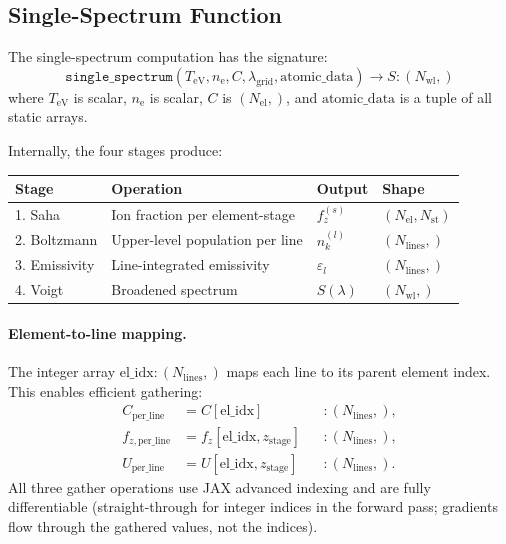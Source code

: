 \documentclass[11pt]{article}
\newcommand{\TeV}{T_\mathrm{eV}}
\newcommand{\ne}{n_\mathrm{e}}
\begin{document}
\subsection{Single-Spectrum Function}
\label{sec:single-spectrum}

The single-spectrum computation has the signature:
\begin{equation}
  \label{eq:single-sig}
  \texttt{single\_spectrum}(\TeV, \ne, C, \lambda_\mathrm{grid},
  \mathrm{atomic\_data}) \to S \colon (N_\mathrm{wl},)
\end{equation}
where $\TeV$ is scalar, $\ne$ is scalar, $C$ is $(N_\mathrm{el},)$,
and $\mathrm{atomic\_data}$ is a tuple of all static arrays.

Internally, the four stages produce:
\begin{center}
\begin{tabular}{llll}
\toprule
\textbf{Stage} & \textbf{Operation} & \textbf{Output} & \textbf{Shape} \\
\midrule
1. Saha    & Ion fraction per element-stage & $f_z^{(s)}$  & $(N_\mathrm{el}, N_\mathrm{st})$ \\
2. Boltzmann & Upper-level population per line & $n_k^{(l)}$ & $(N_\mathrm{lines},)$ \\
3. Emissivity & Line-integrated emissivity      & $\varepsilon_l$ & $(N_\mathrm{lines},)$ \\
4. Voigt   & Broadened spectrum               & $S(\lambda)$ & $(N_\mathrm{wl},)$ \\
\bottomrule
\end{tabular}
\end{center}

\paragraph{Element-to-line mapping.}
The integer array $\mathrm{el\_idx}\colon (N_\mathrm{lines},)$ maps each line
to its parent element index. This enables efficient gathering:
\begin{align}
  C_\mathrm{per\_line} &= C[\mathrm{el\_idx}] &&\colon (N_\mathrm{lines},), \label{eq:gather-C}\\
  f_{z,\mathrm{per\_line}} &= f_z[\mathrm{el\_idx}, z_\mathrm{stage}]
    &&\colon (N_\mathrm{lines},), \label{eq:gather-fz}\\
  U_\mathrm{per\_line} &= U[\mathrm{el\_idx}, z_\mathrm{stage}]
    &&\colon (N_\mathrm{lines},). \label{eq:gather-U}
\end{align}
All three gather operations use JAX advanced indexing and are fully
differentiable (straight-through for integer indices in the forward pass;
gradients flow through the gathered values, not the indices).
\end{document}
